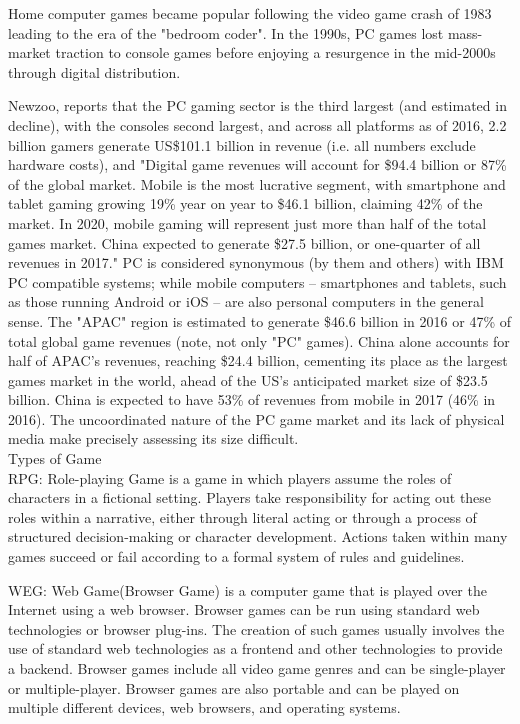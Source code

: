 Home computer games became popular following the video game crash of 1983 leading to the era of the "bedroom coder". In the 1990s, PC games lost mass-market traction to console games before enjoying a resurgence in the mid-2000s through digital distribution.

Newzoo, reports that the PC gaming sector is the third largest (and estimated in decline), with the consoles second largest, and across all platforms as of 2016, 2.2 billion gamers generate US\$101.1 billion in revenue (i.e. all numbers exclude hardware costs), and "Digital game revenues will account for \$94.4 billion or 87\% of the global market. Mobile is the most lucrative segment, with smartphone and tablet gaming growing 19\% year on year to \$46.1 billion, claiming 42\% of the market. In 2020, mobile gaming will represent just more than half of the total games market. China expected to generate \$27.5 billion, or one-quarter of all revenues in 2017." PC is considered synonymous (by them and others) with IBM PC compatible systems; while mobile computers – smartphones and tablets, such as those running Android or iOS – are also personal computers in the general sense. The "APAC" region is estimated to generate \$46.6 billion in 2016 or 47\% of total global game revenues (note, not only "PC" games). China alone accounts for half of APAC's revenues, reaching \$24.4 billion, cementing its place as the largest games market in the world, ahead of the US's anticipated market size of \$23.5 billion. China is expected to have 53\% of revenues from mobile in 2017 (46\% in 2016). The uncoordinated nature of the PC game market and its lack of physical media make precisely assessing its size difficult.\cite{einstein}\\
Types of Game\\
RPG: Role-playing Game is a game in which players assume the roles of characters in a fictional setting. Players take responsibility for acting out these roles within a narrative, either through literal acting or through a process of structured decision-making or character development. Actions taken within many games succeed or fail according to a formal system of rules and guidelines.

WEG: Web Game(Browser Game) is a computer game that is played over the Internet using a web browser. Browser games can be run using standard web technologies or browser plug-ins. The creation of such games usually involves the use of standard web technologies as a frontend and other technologies to provide a backend. Browser games include all video game genres and can be single-player or multiple-player. Browser games are also portable and can be played on multiple different devices, web browsers, and operating systems.

